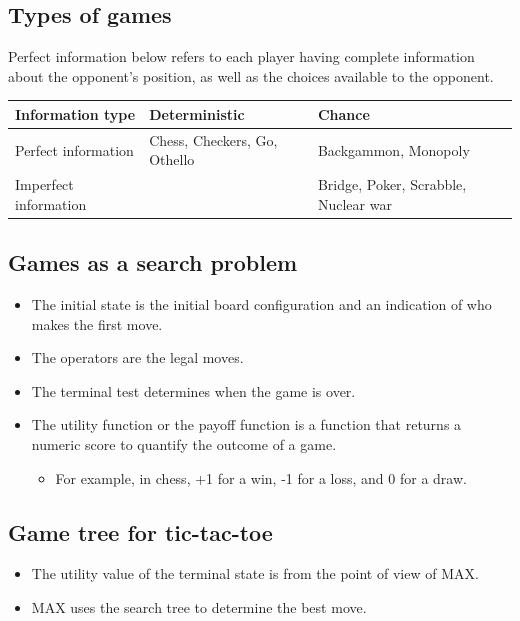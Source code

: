 \documentclass[11pt]{article}
\begin{document}
 \newpage
\subsection{Types of games}
\label{sec:org48f3687}
Perfect information below refers to each player having complete information about the opponent's position, as well as the choices available to the opponent.

\begin{center}
\begin{tabular}{l|l|l}
Information type & Deterministic & Chance\\
\hline
Perfect information & Chess, Checkers, Go, Othello & Backgammon, Monopoly\\
Imperfect information &  & Bridge, Poker, Scrabble, Nuclear war\\
\end{tabular}
\end{center}
\subsection{Games as a search problem}
\label{sec:orge771316}
\begin{itemize}
\item The initial state is the initial board configuration and an indication of who makes the first move.
\item The operators are the legal moves.
\item The terminal test determines when the game is over.
\item The utility function or the payoff function is a function that returns a numeric score to quantify the outcome of a game.
\begin{itemize}
\item For example, in chess, +1 for a win, -1 for a loss, and 0 for a draw.
\end{itemize}
\end{itemize}

 \newpage
\subsection{Game tree for tic-tac-toe}
\label{sec:org2782e89}
\begin{itemize}
\item The utility value of the terminal state is from the point of view of MAX.
\item MAX uses the search tree to determine the best move.
\end{itemize}
\end{document}
